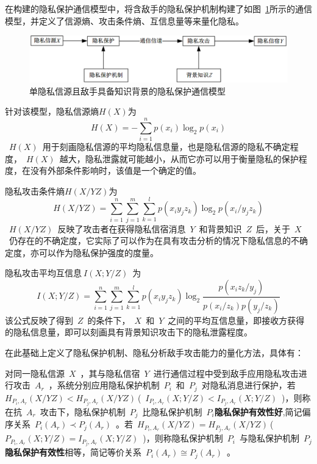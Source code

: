 \documentclass[pdftex,notypeinfo,twoside,openany,UTF8,fntef]{CASthesis}
\theoremstyle{THrm}{
	\newtheorem{question}{Question}[section]
	\newtheorem{property}{性质}[section]
	\newtheorem{assumption}{假设}[section]
	\newtheorem{claim}[lemma]{断言}
	
}
\begin{document}
在构建的隐私保护通信模型中，将含敌手的隐私保护机制构建了如图~\ref{fig:Communication-Model-for-Privacy-of-Single}所示的通信模型，并定义了信源熵、攻击条件熵、互信息量等来量化隐私。
\begin{figure}[htbp]
	\centering
	\includegraphics[width = 0.95\linewidth]{./figures/Communication-Model-for-Privacy-of-Single.png}
	\caption{单隐私信源且敌手具备知识背景的隐私保护通信模型}
	\label{fig:Communication-Model-for-Privacy-of-Single}
\end{figure}

针对该模型，隐私信源熵$H(X)$为
\begin{equation}
H(X)=-\sum_{i=1}^{n}p(x_{i})\log_{2}p(x_{i})
\end{equation}
~$H(X)$~用于刻画隐私信源的平均隐私信息量，也是隐私信源的隐私不确定程度，~$H(X)$~越大，隐私泄露就可能越小，从而它亦可以用于衡量隐私的保护程度，在没有外部条件影响时，该值是一个确定的值。

隐私攻击条件熵$H(X/YZ)$为
\begin{equation}
H(X/YZ)=\sum_{i=1}^{n}\sum_{j=1}^{m}\sum_{k=1}^{l}p(x_{i}y_{j}z_{k})\log_{2}p(x_{i}/y_{j}z_{k})
\end{equation}
~$H(X/YZ)$~反映了攻击者在获得隐私信宿消息~$Y$~和背景知识~$Z$~后，关于~$X$~仍存在的不确定度，它实际了可以作为在具有攻击分析的情况下隐私信息的不确定度，亦可以作为隐私保护强度的度量。

隐私攻击平均互信息$~I(X;Y/Z)$~为
\begin{equation}
I(X;Y/Z)=\sum_{i=1}^{n}\sum_{j=1}^{m}\sum_{k=1}^{l}p(x_{i}y_{j}z_{k})\log_{2}\frac{p(x_{i}z_{k}/y_{j})}{p(x_{i}/z_{k})p(y_{j}/z_{k})}
\end{equation}
该公式反映了得到~$Z$~的条件下，~$X$~和~$Y$~之间的平均互信息量，即接收方获得的隐私信息量，即可以刻画具有背景知识攻击下的隐私泄露程度。

在此基础上定义了隐私保护机制、隐私分析敌手攻击能力的量化方法，具体有：

对同一隐私信源~$X$~，其与隐私信宿~$Y$~进行通信过程中受到敌手应用隐私攻击进行攻击~$A_{r}$~，系统分别应用隐私保护机制~$P_{i}$~和~$P_{j}$~对隐私消息进行保护，若~$H_{P_{i},A_{r}}(X/YZ)<H_{P_{j},A_{r}}(X/YZ)~$(~$I_{P_{i},A_{r}}(X;Y/Z)<I_{P_{j},A_{r}}(X;Y/Z)$~)，则称在抗~$A_{r}$~攻击下，隐私保护机制~$P_{j}$~比隐私保护机制~$P_{i}$\textbf{隐私保护有效性好},简记偏序关系~$P_{i}(A_{r})\prec P_{j}(A_{r})$~。若~$H_{P_{i},A_{r}}(X/YZ)=H_{P_{j},A_{r}}(X/YZ)~$(~$P_{P_{i},A_{r}}(X;Y/Z)=I_{P_{j},A_{r}}(X;Y/Z)$~)，则称隐私保护机制~$P_{i}$~与隐私保护机制~$P_{j}$\textbf{隐私保护有效性}相等，简记等价关系~$P_{i}(A_{r})\cong P_{j}(A_{r})$~。
\end{document}
